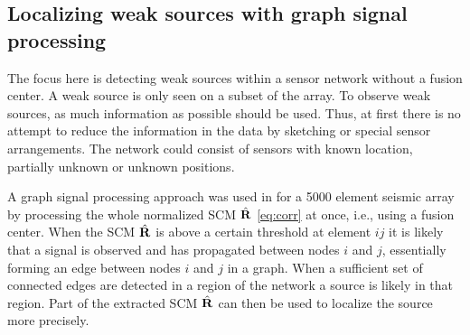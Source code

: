\subsection{Localizing weak sources with graph signal processing}
 \label{sec:weakSources}


The focus here is detecting weak sources within a sensor network without a fusion center. A weak source is only seen on a subset of the array. To observe weak sources, as much information as possible should be used. Thus, at first there is no attempt to reduce the information in the data by sketching or special sensor arrangements. The network could consist of sensors with known location, partially unknown or unknown positions.



A graph signal processing approach was used in \cite{riahi2017} for a 5000 element seismic array by processing the whole normalized SCM $\hat{\bf R}$ \eqref{eq:corr} at once, i.e., using a fusion center. 
When the SCM $\hat{\bf R }$ is above a certain threshold at  element $ij$ it is likely that a signal is observed and has propagated between nodes $i$ and $j$, essentially forming an edge between nodes  $i$ and $j$ in a graph. When a sufficient set of connected edges are detected in a region of the network a source is likely in that region. Part of the extracted SCM $\hat{\bf R}$ can then be used to localize the source more precisely.

